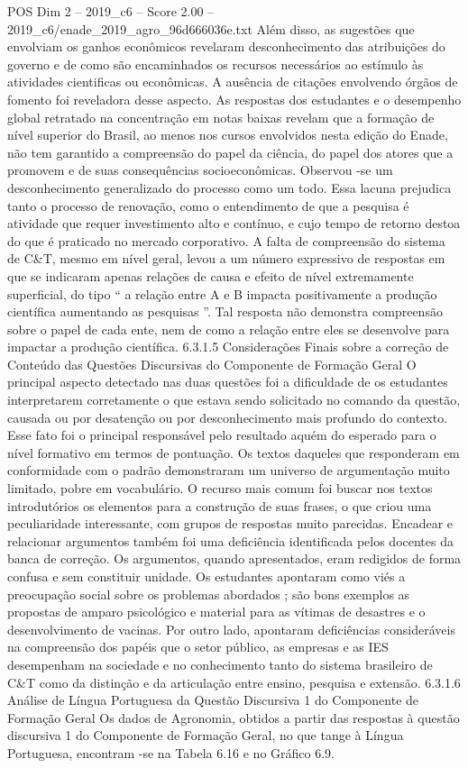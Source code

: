 \begin{textsample}{POS Dim 2 – 2019\_c6 – Score 2.00 – 2019\_c6/enade\_2019\_agro\_96d666036e.txt}
Além disso, as sugestões que envolviam os ganhos econômicos revelaram desconhecimento das atribuições do governo e de como são encaminhados os recursos necessários ao estímulo às atividades cientificas ou econômicas.
A ausência de citações envolvendo órgãos de fomento foi reveladora desse aspecto.
As respostas dos estudantes e o desempenho global retratado na concentração em notas baixas revelam que a formação de nível superior do Brasil, ao menos nos cursos envolvidos nesta edição do Enade, não tem garantido a compreensão do papel da ciência, do papel dos atores que a promovem e de suas consequências socioeconômicas.
Observou -se um desconhecimento generalizado do processo como um todo.
Essa lacuna prejudica tanto o processo de renovação, como o entendimento de que a pesquisa é atividade que requer investimento alto e contínuo, e cujo tempo de retorno destoa do que é praticado no mercado corporativo.
A falta de compreensão do sistema de C\&T, mesmo em nível geral, levou a um número expressivo de respostas em que se indicaram apenas relações de causa e efeito de nível extremamente superficial, do tipo “ a relação entre A e B impacta positivamente a produção científica aumentando as pesquisas ”.
Tal resposta não demonstra compreensão sobre o papel de cada ente, nem de como a relação entre eles se desenvolve para impactar a produção científica. 6.3.1.5 Considerações Finais sobre a correção de Conteúdo das Questões Discursivas do Componente de Formação Geral O principal aspecto detectado nas duas questões foi a dificuldade de os estudantes interpretarem corretamente o que estava sendo solicitado no comando da questão, causada ou por desatenção ou por desconhecimento mais profundo do contexto.
Esse fato foi o principal responsável pelo resultado aquém do esperado para o nível formativo em termos de pontuação.
Os textos daqueles que responderam em conformidade com o padrão demonstraram um universo de argumentação muito limitado, pobre em vocabulário.
O recurso mais comum foi buscar nos textos introdutórios os elementos para a construção de suas frases, o que criou uma peculiaridade interessante, com grupos de respostas muito parecidas.
Encadear e relacionar argumentos também foi uma deficiência identificada pelos docentes da banca de correção.
Os argumentos, quando apresentados, eram redigidos de forma confusa e sem constituir unidade.
Os estudantes apontaram como viés a preocupação social sobre os problemas abordados ; são bons exemplos as propostas de amparo psicológico e material para as vítimas de desastres e o desenvolvimento de vacinas.
Por outro lado, apontaram deficiências consideráveis na compreensão dos papéis que o setor público, as empresas e as IES desempenham na sociedade e no conhecimento tanto do sistema brasileiro de C\&T como da distinção e da articulação entre ensino, pesquisa e extensão. 6.3.1.6 Análise de Língua Portuguesa da Questão Discursiva 1 do Componente de Formação Geral Os dados de Agronomia, obtidos a partir das respostas à questão discursiva 1 do Componente de Formação Geral, no que tange à Língua Portuguesa, encontram -se na Tabela 6.16 e no Gráfico 6.9.

\end{textsample}
